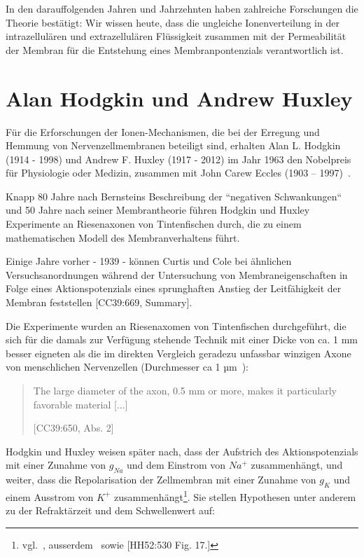 In den darauffolgenden Jahren und Jahrzehnten haben zahlreiche Forschungen die Theorie bestätigt: Wir wissen heute, dass die ungleiche Ionenverteilung in der intrazellulären und extrazellulären Flüssigkeit zusammen mit der Permeabilität der Membran für die Entstehung eines Membranpontenzials verantwortlich ist.

\section{Alan Hodgkin und Andrew Huxley}\label{appendix:hodgkinhuxley}

Für die Erforschungen der Ionen-Mechanismen, die bei der Erregung und Hemmung von Nervenzellmembranen beteiligt sind, erhalten Alan L. Hodgkin (1914 - 1998) und Andrew F. Huxley (1917 - 2012) im Jahr 1963 den Nobelpreis für Physiologie oder Medizin, zusammen mit John Carew Eccles (1903 – 1997)~\cite{Gle09}.

Knapp 80 Jahre nach Bernsteins Beschreibung der ``negativen Schwankungen`` und 50 Jahre nach seiner Membrantheorie führen Hodgkin und Huxley Experimente an Riesenaxonen von Tintenfischen durch, die zu einem mathematischen Modell des Membranverhaltens führt.

Einige Jahre vorher - 1939 - können Curtis und Cole bei ähnlichen Versuchsanordnungen während der Untersuchung von Membraneigenschaften in Folge eines Aktionspotenzials eines sprunghaften Anstieg der Leitfähigkeit der Membran feststellen [CC39:669, Summary].

Die Experimente wurden an Riesenaxomen von Tintenfischen durchgeführt, die sich für die damals zur Verfügung stehende Technik mit einer Dicke von ca. 1 mm besser eigneten als die im direkten Vergleich geradezu unfassbar winzigen Axone von menschlichen Nervenzellen (Durchmesser ca 1 µm~\cite[79]{Jon19}):

\blockquote[{[CC39:650, Abs. 2]}]{
    The large diameter of the axon, 0.5 mm or more, makes it particularly favorable material {[...]}
}

Hodgkin und Huxley weisen später nach, dass der Aufstrich des Aktionspotenzials mit einer Zunahme von $g_{Na}$ und dem Einstrom von $Na^+$ zusammenhängt, und weiter, dass die Repolarisation der Zellmembran mit einer Zunahme von $g_K$ und einem Ausstrom von $K^+$ zusammenhängt\footnote{
    vgl.~\cite[75]{Jon19}, ausserdem~\cite[96]{BCP18} sowie {[HH52:530 Fig. 17.]}
}.
Sie stellen Hypothesen unter anderem zu der Refraktärzeit und dem Schwellenwert auf:\\

